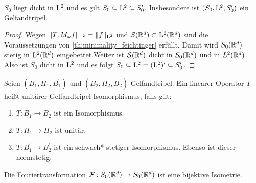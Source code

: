 \begin{sz}
	$ S_0 $ liegt dicht in $ \mathrm{L}^2 $ und es gilt $ S_0 \subseteq \mathrm{L}^2 \subseteq S_0^\prime $.
	Insbesondere ist $ (S_0,\mathrm{L}^2, S_0^\prime) $ ein Gelfandtripel.
\end{sz}
 
\begin{proof}
	Wegen $ \| T_x M_\omega f\|_{\mathrm{L}^2} = \| f \|_{\mathrm{L}^2} $ und $ \mathcal{S}(\mathbb{R}^d) \subset \mathrm{L}^2(\mathbb{R}^d) $ sind die Voraussetzungen von \ref{th:minimality_feichtinger} erfüllt.
	Damit wird $ S_0(\mathbb{R}^d)$ stetig in $\mathrm{L}^2(\mathbb{R}^d) $ eingebettet.Weiter ist $ \mathcal{S}(\mathbb{R}^d)  $ dicht in $ S_0(\mathbb{R}^d) $ und in $ L^2(\mathbb{R}^d) $.
	Also ist $ S_0 $ dicht in $ \mathrm{L}^2 $ und es 
	folgt $ S_0 \subseteq \mathrm{L}^2 = (\mathrm{L}^2)^\prime \subseteq S_0^\prime $.
\end{proof}




\begin{df}
	Seien $ (B_1, H_1,B_1^\prime) $ und $ (B_2, H_2,B_2^\prime) $ Gelfandtripel.
	Ein linearer Operator $ T $ heißt unitärer Gelfandtripel-Isomorphismus, falls gilt:
	\begin{enumerate}[label =\textbf{(\roman*)}]
		\item 
		$ T : B_1 \to B_2 $ ist ein Isomorphismus.
		\item
		$ T : H_1 \to H_2 $ ist unitär.
		\item 
		$ T : B_1^\prime \to B_2^\prime $ ist ein schwach*-stetiger Isomorphismus.
		Ebenso ist dieser normstetig.
	\end{enumerate}
\end{df}


\begin{sz}\label{th:fourier_feichtinger}
	Die Fouriertransformation $ \mathcal{F} : S_0(\mathbb{R}^d) \to S_0(\mathbb{R}^d) $ ist eine bijektive Isometrie.
\end{sz}

